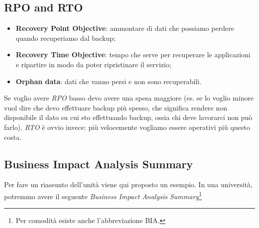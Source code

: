 \subsection{RPO and RTO}

\begin{itemize}
 \item \textbf{Recovery Point Objective}: ammontare di dati che possiamo
perdere quando recuperiamo dal backup;

 \item \textbf{Recovery Time Objective}: tempo che serve per recuperare le
applicazioni e ripartire in modo da poter ripristinare il servizio;

 \item \textbf{Orphan data}: dati che vanno persi e non sono recuperabili.
\end{itemize}

Se voglio avere \textit{RPO} basso devo avere una spesa maggiore (es. se lo
voglio minore vuol dire che devo effettuare backup più spesso, che significa
rendere non disponibile il dato su cui sto effettuando backup, ossia chi deve
lavorarci non può farlo).
\textit{RTO} è ovvio invece: più velocemente vogliamo essere operativi più
questo costa.

\subsection{Business Impact Analysis Summary}

Per fare un riassunto dell'unità viene qui proposto un esempio. In una
università, potremmo avere il seguente \textit{Business Impact Analysis
Summary}\footnote{Per comodità esiste anche l'abbreviazione BIA.}

\begin{table}[H]
\centering
{}
\caption{Un esempio di BIA per una Università}
\end{table}



